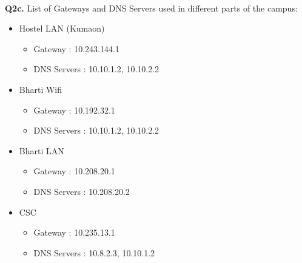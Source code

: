 \documentclass[12pt]{article}
\begin{document}
~\\
{\bfseries Q2c.} List of Gateways and DNS Servers used in different parts of the campus:
\begin{itemize}
\item Hostel LAN (Kumaon)
\begin{itemize}
\item Gateway : 10.243.144.1
\item DNS Servers : 10.10.1.2, 10.10.2.2
\end{itemize}
\item Bharti Wifi
\begin{itemize}
\item Gateway : 10.192.32.1
\item DNS Servers : 10.10.1.2, 10.10.2.2
\end{itemize}
\item Bharti LAN
\begin{itemize}
\item Gateway : 10.208.20.1
\item DNS Servers : 10.208.20.2
\end{itemize}
\item CSC
\begin{itemize}
\item Gateway : 10.235.13.1
\item DNS Servers : 10.8.2.3, 10.10.1.2
\end{itemize}
\end{itemize}
\end{document}
